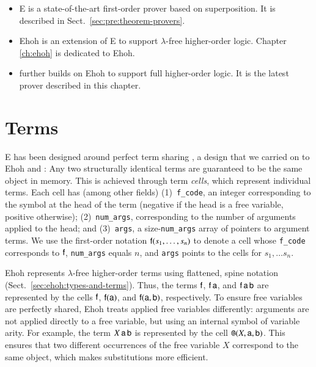 \begin{itemize}
  \item E is a state-of-the-art first-order prover based on superposition. It is described in
  Sect.~\ref{sec:pre:theorem-provers}.
  \item Ehoh is an extension of E to support $\lambda$-free higher-order logic. Chapter \ref{ch:ehoh}
  is dedicated to Ehoh.
  \item \ehohii{} further builds on Ehoh to support full higher-order logic. It is the latest prover
  described in this chapter.
\end{itemize}

\section{Terms}
\label{sec:ehoh2:terms}

E has been designed around perfect term sharing %
\cite{ls-01-shared}, a design that we carried on to  Ehoh and \ehohii{}: Any two structurally identical terms are
guaranteed to be the same object in memory. This is achieved through term
\emph{cells}, which represent individual terms. Each cell has (among other fields)
(1)~\texttt{f\_code}, an integer corresponding to the symbol at the head of the term (negative
if the head is a free variable, positive otherwise); (2)~\texttt{num\_args},
corresponding to the number of arguments applied to the head; and (3)~\texttt{args},
a size-\texttt{num\_args} array of pointers to argument terms. We
use the first-order notation $\mathsf{f}(s_1, \ldots, s_n)$ to denote a cell whose
\texttt{f\_code} corresponds to $\mathsf{f}$, \texttt{num\_args} equals $n$, and
\texttt{args} points to the cells for $s_1, \ldots s_n$.

Ehoh represents $\lambda$-free higher-order terms using flattened, spine notation
(Sect.~\ref{sec:ehoh:types-and-terms}).
Thus, the terms $\mathsf{f}$, $\mathsf{f} \, \mathsf{a}$, and $\mathsf{f} \, \mathsf{a} \,
\mathsf{b}$ are represented by the cells $\mathsf{f}$,
$\mathsf{f}(\mathsf{a})$, and $\mathsf{f}(\mathsf{a}, \mathsf{b})$, respectively.
To ensure free variables are
perfectly shared, Ehoh treats applied free variables differently: arguments are
not applied directly to a free variable, but using an internal symbol
\internalat{} of variable arity. For example, the term $X \, \mathsf{a} \, \mathsf{b}$ is
represented by the cell $\texttt{@}(X, \mathsf{a}, \mathsf{b})$. This ensures that
two different occurrences of the free variable $X$ correspond to the same object,
which makes substitutions more efficient.


